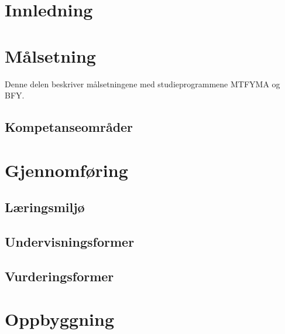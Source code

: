 \documentclass[a4paper, oneside, 12pt]{memoir}
\begin{document}
\frontmatter
\tableofcontents

\part{Innledning}

\mainmatter



\part{Målsetning}

Denne delen beskriver målsetningene med studieprogrammene MTFYMA og BFY.


\chapter{Kompetanseområder}


\part{Gjennomføring}

	\chapter{Læringsmiljø}
	
	\chapter{Undervisningsformer}
	
	\chapter{Vurderingsformer}

\part{Oppbyggning}

\renewcommand{\appendixtocname}{Tillegg}
\renewcommand{\appendixpagename}{Tillegg}
\appendixpage
\end{document}
